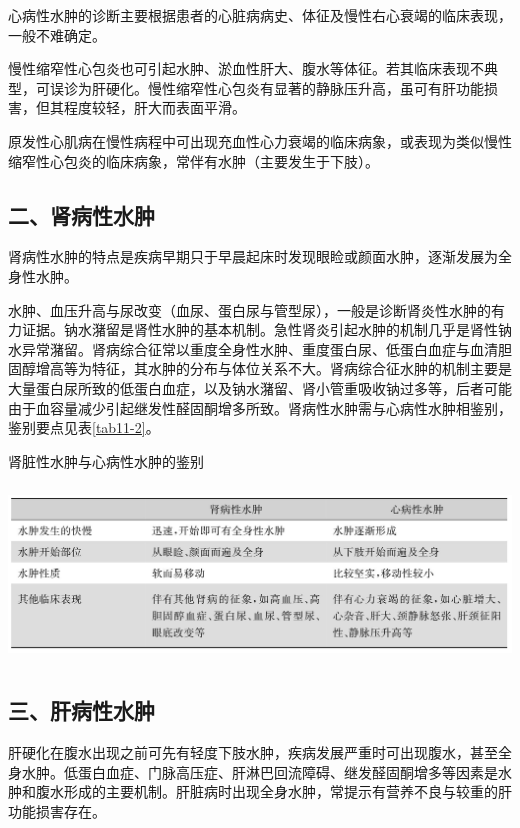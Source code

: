 心病性水肿的诊断主要根据患者的心脏病病史、体征及慢性右心衰竭的临床表现，一般不难确定。

慢性缩窄性心包炎也可引起水肿、淤血性肝大、腹水等体征。若其临床表现不典型，可误诊为肝硬化。慢性缩窄性心包炎有显著的静脉压升高，虽可有肝功能损害，但其程度较轻，肝大而表面平滑。

原发性心肌病在慢性病程中可出现充血性心力衰竭的临床病象，或表现为类似慢性缩窄性心包炎的临床病象，常伴有水肿（主要发生于下肢）。

\subsection{二、肾病性水肿}

肾病性水肿的特点是疾病早期只于早晨起床时发现眼睑或颜面水肿，逐渐发展为全身性水肿。

水肿、血压升高与尿改变（血尿、蛋白尿与管型尿），一般是诊断肾炎性水肿的有力证据。钠水潴留是肾性水肿的基本机制。急性肾炎引起水肿的机制几乎是肾性钠水异常潴留。肾病综合征常以重度全身性水肿、重度蛋白尿、低蛋白血症与血清胆固醇增高等为特征，其水肿的分布与体位关系不大。肾病综合征水肿的机制主要是大量蛋白尿所致的低蛋白血症，以及钠水潴留、肾小管重吸收钠过多等，后者可能由于血容量减少引起继发性醛固酮增多所致。肾病性水肿需与心病性水肿相鉴别，鉴别要点见表\ref{tab11-2}。

\begin{table}[htbp]
\centering
\caption{肾脏性水肿与心病性水肿的鉴别}
\label{tab11-2}
\includegraphics[width=5.91667in,height=1.84375in]{./images/Image00081.jpg}
\end{table}

\subsection{三、肝病性水肿}

肝硬化在腹水出现之前可先有轻度下肢水肿，疾病发展严重时可出现腹水，甚至全身水肿。低蛋白血症、门脉高压症、肝淋巴回流障碍、继发醛固酮增多等因素是水肿和腹水形成的主要机制。肝脏病时出现全身水肿，常提示有营养不良与较重的肝功能损害存在。


